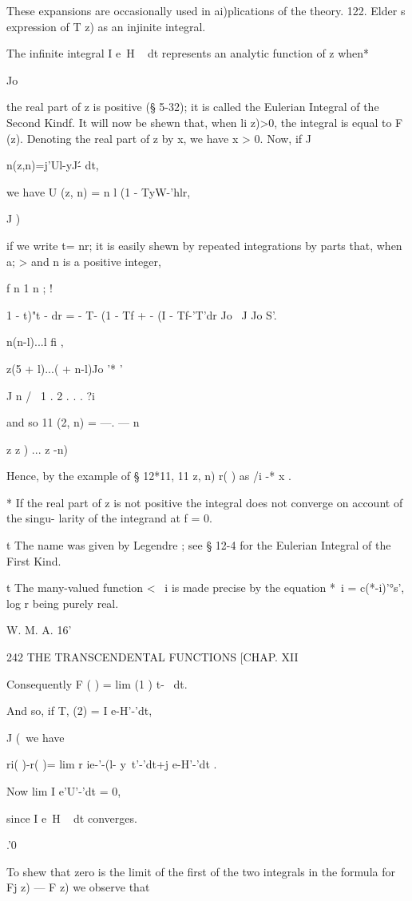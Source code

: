 These expansions are occasionally used in ai)plications of the theory.
122. Elder s expression of T z) as an injinite integral.

The infinite integral I e~H ~ dt represents an analytic function of z
when*

Jo

the real part of z is positive (§ 5-32); it is called the Eulerian
Integral of the Second Kindf. It will now be shewn that, when li z)>0,
the integral is equal to F (z). Denoting the real part of z by x, we
have x > 0. Now, if J

n(z,n)=j'Ul-yJ\'- dt,

we have U (z, n) = n l (1 - TyW-'hlr,

J )

if we write t= nr; it is easily shewn by repeated integrations by
parts that, when a; > and n is a positive integer,

f n 1 n ; !

 1 - t)"t - dr = - T- (1 - Tf + - (I - Tf-'T'dr Jo \ J Jo S'.

n(n-l)...l fi ,

z(5 + l)...( + n-l)Jo '* '

J n / \ 1 . 2 . . . ?i

and so 11 (2, n) = —. — n

z z ) ... z -n)

Hence, by the example of § 12*11, 11 z, n) r( ) as /i -* x .

* If the real part of z is not positive the integral does not converge
on account of the singu- larity of the integrand at f = 0.

t The name was given by Legendre ; see § 12-4 for the Eulerian
Integral of the First Kind.

t The many-valued function < ~i is made precise by the equation *~i =
c(*-i)'°s', log r being purely real.

W. M. A. 16'

242 THE TRANSCENDENTAL FUNCTIONS [CHAP. XII

Consequently F ( ) = lim (1 ) t-~ dt.

And so, if T, (2) = I e-H'-'dt,

J (\ we have

ri( )-r( )= lim r ie-'-(l- y\ t'-'dt+j e-H'-'dt .

Now lim I e'U'-'dt = 0,

since I e~H ~ dt converges.

.'0

To shew that zero is the limit of the first of the two integrals in
the formula for Fj z) — F z) we observe that

